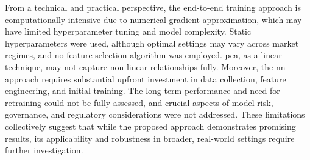 From a technical and practical perspective, the end-to-end training approach is computationally intensive due to numerical gradient approximation, which may have limited hyperparameter tuning and model complexity. Static hyperparameters were used, although optimal settings may vary across market regimes, and no feature selection algorithm was employed. \ac{pca}, as a linear technique, may not capture non-linear relationships fully. Moreover, the \ac{nn} approach requires substantial upfront investment in data collection, feature engineering, and initial training. The long-term performance and need for retraining could not be fully assessed, and crucial aspects of model risk, governance, and regulatory considerations were not addressed. These limitations collectively suggest that while the proposed approach demonstrates promising results, its applicability and robustness in broader, real-world settings require further investigation.